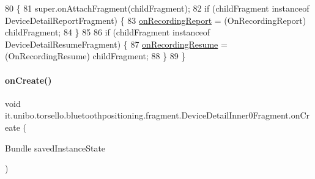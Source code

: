 \begin{DoxyCode}
80                                                          \{
81         super.onAttachFragment(childFragment);
82         \textcolor{keywordflow}{if} (childFragment instanceof DeviceDetailReportFragment) \{
83             \hyperlink{classit_1_1unibo_1_1torsello_1_1bluetoothpositioning_1_1fragment_1_1DeviceDetailInner0Fragment_afb73345c725b2c9ad4b430915d5f1b15_afb73345c725b2c9ad4b430915d5f1b15}{onRecordingReport} = (OnRecordingReport) childFragment;
84         \}
85 
86         \textcolor{keywordflow}{if} (childFragment instanceof DeviceDetailResumeFragment) \{
87             \hyperlink{classit_1_1unibo_1_1torsello_1_1bluetoothpositioning_1_1fragment_1_1DeviceDetailInner0Fragment_a8603d0fe3501a6267a8cf9f9f0d29360_a8603d0fe3501a6267a8cf9f9f0d29360}{onRecordingResume} = (OnRecordingResume) childFragment;
88         \}
89     \}
\end{DoxyCode}
\hypertarget{classit_1_1unibo_1_1torsello_1_1bluetoothpositioning_1_1fragment_1_1DeviceDetailInner0Fragment_a799f69a27b82be0bf972611b1743e8bd_a799f69a27b82be0bf972611b1743e8bd}{}\label{classit_1_1unibo_1_1torsello_1_1bluetoothpositioning_1_1fragment_1_1DeviceDetailInner0Fragment_a799f69a27b82be0bf972611b1743e8bd_a799f69a27b82be0bf972611b1743e8bd} 
\paragraph{\texorpdfstring{on\+Create()}{onCreate()}}
{\footnotesize\ttfamily void it.\+unibo.\+torsello.\+bluetoothpositioning.\+fragment.\+Device\+Detail\+Inner0\+Fragment.\+on\+Create (\begin{DoxyParamCaption}\item[{Bundle}]{saved\+Instance\+State }\end{DoxyParamCaption})}


